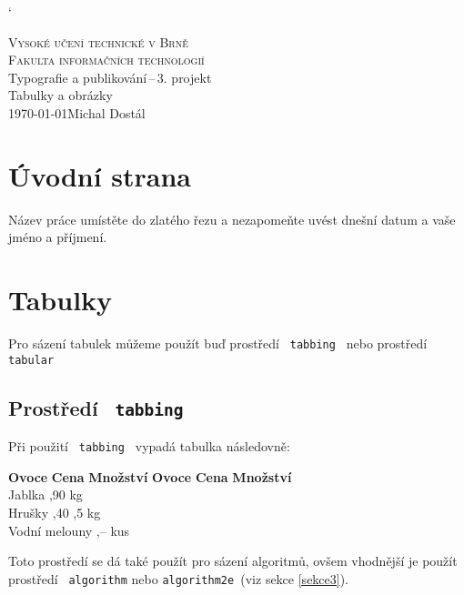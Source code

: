 \documentclass[a4paper, 11pt]{article}
\begin{document}
\catcode` 
    \begin{titlepage}
        \begin{center}
            \textsc{\Huge Vysoké učení technické v Brně\\ \medskip
            \huge Fakulta informačních technologií}\\
            \LARGE Typografie a publikování\,--\,3. projekt\\
            \Huge Tabulky a obrázky\\
            \Large \today \hfill         Michal Dostál \newpage
        \end{center}
    \end{titlepage}
\newpage
    \section{Úvodní strana}
    Název práce umístěte do zlatého řezu a nezapomeňte uvést dnešní datum a vaše jméno a příjmení.
    
    \section{Tabulky}
    Pro sázení tabulek můžeme použít buď prostředí \verb| tabbing | nebo prostředí \verb| tabular|
    
    \subsection{Prostředí \texttt{ tabbing }}
    Při použití \texttt{ tabbing } vypadá tabulka následovně:
    \begin{tabbing}
        \textbf{Ovoce} \quad \quad \quad \quad \quad \= \textbf{Cena} \quad \= \textbf{Množství} \kill
        \textbf{Ovoce} \> \textbf{Cena} \> \textbf{Množství} \\
        Jablka  ,90     kg \\
        Hrušky  ,40    ,5 kg\\
        Vodní melouny   ,--     kus\\
    \end{tabbing}
    Toto prostředí se dá také použít pro sázení algoritmů, ovšem vhodnější je použít prostředí \texttt{ algorithm} nebo \texttt{algorithm2e }(viz sekce \ref{sekce3}).
    
\end{document}
